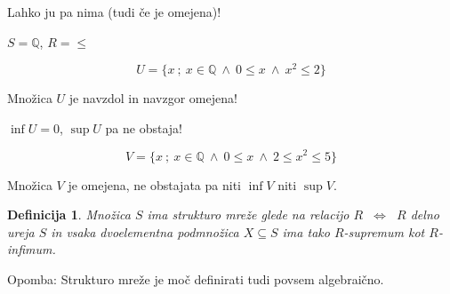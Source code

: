 \documentclass[11pt,paper=b5,DIV=13,headinclude,footinclude]{scrbook}
\newcounter{example}
\def\inn {{~\wedge~}}
\def\cee {{~\Leftrightarrow~}}
\newtheorem*{definicija}{Definicija}
\begin{document}
Lahko ju pa nima (tudi če je omejena)!

\bigskip
\begin{example*}

$S = \mathbb{Q}$, $R = \le$

$$U = \{x~;~x\in \mathbb{Q}\inn 0\le x \inn x^2\le 2\}$$

Množica $U$ je navzdol in navzgor omejena!

$\inf U = 0$, $\sup U$ pa ne obstaja!

\medskip
$$V = \{x~;~x\in \mathbb{Q}\inn 0\le x \inn 2\le x^2\le 5\}$$

Množica $V$ je omejena, ne obstajata pa niti $\inf V$ niti $\sup V$.\end{example*}

\begin{definicija}
Množica $S$ ima strukturo {\em mreže} glede na relacijo $R$ $\cee$
$R$ delno ureja $S$ in vsaka {\em dvoelementna} podmnožica $X\subseteq S$
ima tako $R$-supremum kot $R$-infimum.
\end{definicija}

\bigskip

Opomba: Strukturo mreže je moč definirati tudi povsem algebraično.

\bigskip
\end{document}
